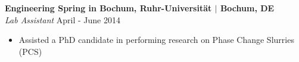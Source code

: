 \documentclass[line,resmargin]{res}
\begin{document}
\begin{resume}
\textbf{Engineering Spring in Bochum, Ruhr-Universit{\"a}t $|$ Bochum, DE} \\
{\sl Lab Assistant} \hfill April - June 2014 \\
\begin{itemize} \itemsep -2pt
	\item  Assisted a PhD candidate in performing research on Phase Change Slurries (PCS)
\end{itemize}

\end{resume}
\end{document}
